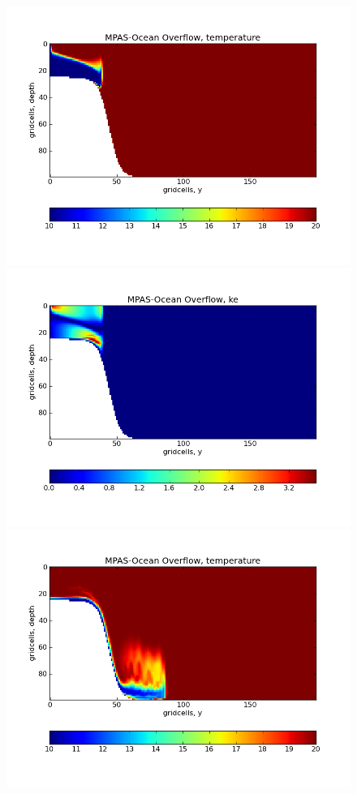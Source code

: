 \begin{figure}[H!]
	\includegraphics[scale=0.4]{ocean/figures/MPAS-O_overflow_temperature_3hrs.png}
	\includegraphics[scale=0.4]{ocean/figures/MPAS-O_overflow_ke_3hrs.png}\\
	\includegraphics[scale=0.4]{ocean/figures/MPAS-O_overflow_temperature_9hrs.png}

\end{figure}
